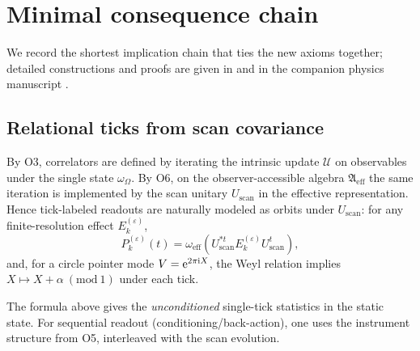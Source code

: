 \section{Minimal consequence chain}
We record the shortest implication chain that ties the new axioms together; detailed constructions and proofs are given in \cite{Ma2025HPA} and in the companion physics manuscript \cite{Ma2025FoP}.

\subsection{Relational ticks from scan covariance}
By O3, correlators are defined by iterating the intrinsic update $\mathcal{U}$ on observables under the single state $\omega_{\Omega}$. By O6, on the observer-accessible algebra $\mathfrak{A}_{\mathrm{eff}}$ the same iteration is implemented by the scan unitary $U_{\mathrm{scan}}$ in the effective representation. Hence tick-labeled readouts are naturally modeled as orbits under $U_{\mathrm{scan}}$: for any finite-resolution effect $E_k^{(\varepsilon)}$,
\begin{equation}
    P_k^{(\varepsilon)}(t)=\omega_{\mathrm{eff}}\!\left(U_{\mathrm{scan}}^{*t} E_k^{(\varepsilon)} U_{\mathrm{scan}}^{t}\right),
\end{equation}
and, for a circle pointer mode $V=\mathrm{e}^{2\pi \mathrm{i} X}$, the Weyl relation implies $X\mapsto X+\alpha\ (\mathrm{mod}\ 1)$ under each tick.
\par
The formula above gives the \emph{unconditioned} single-tick statistics in the static state. For sequential readout (conditioning/back-action), one uses the instrument structure from O5, interleaved with the scan evolution.

